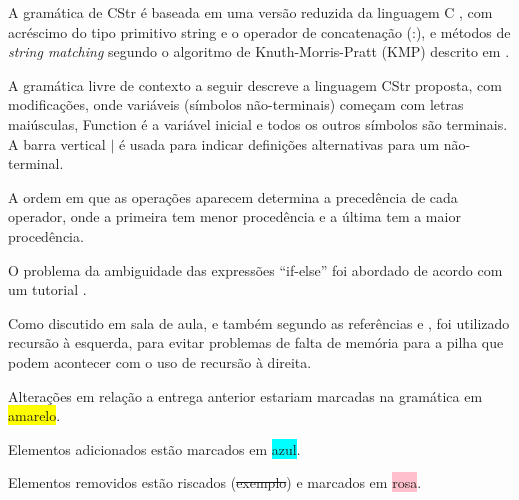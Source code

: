 \documentclass[12pt]{article}
\begin{document}
\indent

A gramática de CStr é baseada em uma versão reduzida da linguagem C \cite{minic}, com acréscimo do tipo primitivo string e o operador de concatenação (:), e métodos de \textit{string matching} segundo o algoritmo de Knuth-Morris-Pratt (KMP) descrito em \cite{clrs09}.

A gramática livre de contexto a seguir descreve a linguagem CStr proposta, com modificações, onde variáveis (símbolos não-terminais) começam com letras maiúsculas, Function é a variável inicial e todos os outros símbolos são terminais. A barra vertical $|$ é usada para indicar definições alternativas para um não-terminal.

A ordem em que as operações aparecem determina a precedência de cada operador, onde a primeira tem menor procedência e a última tem a maior procedência.

O problema da ambiguidade das expressões ``if-else'' foi abordado de acordo com um tutorial \cite{lexeyacctutorial}.

Como discutido em sala de aula, e também segundo as referências \cite{aquamentus} e \cite{lexeyacctutorial}, foi utilizado recursão à esquerda, para evitar problemas de falta de memória para a pilha que podem acontecer com o uso de recursão à direita.

Alterações em relação a entrega anterior estariam marcadas na gramática em \colorbox{yellow}{amarelo}.

Elementos adicionados estão marcados em \colorbox{cyan}{azul}.

Elementos removidos estão riscados (\sout{exemplo}) e marcados em \colorbox{pink}{rosa}.
\end{document}
